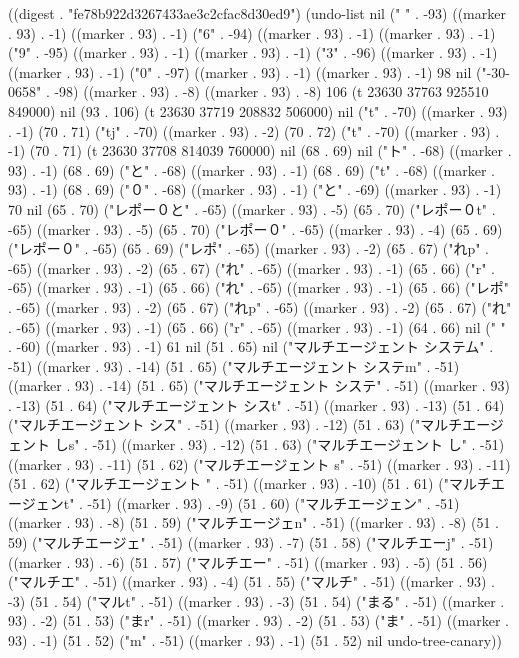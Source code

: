 
((digest . "fe78b922d3267433ae3c2cfac8d30ed9") (undo-list nil (" " . -93) ((marker . 93) . -1) ((marker . 93) . -1) ("6" . -94) ((marker . 93) . -1) ((marker . 93) . -1) ("9" . -95) ((marker . 93) . -1) ((marker . 93) . -1) ("3" . -96) ((marker . 93) . -1) ((marker . 93) . -1) ("0" . -97) ((marker . 93) . -1) ((marker . 93) . -1) 98 nil ("-30-0658" . -98) ((marker . 93) . -8) ((marker . 93) . -8) 106 (t 23630 37763 925510 849000) nil (93 . 106) (t 23630 37719 208832 506000) nil ("t" . -70) ((marker . 93) . -1) (70 . 71) ("tj" . -70) ((marker . 93) . -2) (70 . 72) ("t" . -70) ((marker . 93) . -1) (70 . 71) (t 23630 37708 814039 760000) nil (68 . 69) nil ("ト" . -68) ((marker . 93) . -1) (68 . 69) ("と" . -68) ((marker . 93) . -1) (68 . 69) ("t" . -68) ((marker . 93) . -1) (68 . 69) ("０" . -68) ((marker . 93) . -1) ("と" . -69) ((marker . 93) . -1) 70 nil (65 . 70) ("レポー０と" . -65) ((marker . 93) . -5) (65 . 70) ("レポー０t" . -65) ((marker . 93) . -5) (65 . 70) ("レポー０" . -65) ((marker . 93) . -4) (65 . 69) ("レポー０" . -65) (65 . 69) ("レポ" . -65) ((marker . 93) . -2) (65 . 67) ("れp" . -65) ((marker . 93) . -2) (65 . 67) ("れ" . -65) ((marker . 93) . -1) (65 . 66) ("r" . -65) ((marker . 93) . -1) (65 . 66) ("れ" . -65) ((marker . 93) . -1) (65 . 66) ("レポ" . -65) ((marker . 93) . -2) (65 . 67) ("れp" . -65) ((marker . 93) . -2) (65 . 67) ("れ" . -65) ((marker . 93) . -1) (65 . 66) ("r" . -65) ((marker . 93) . -1) (64 . 66) nil (" " . -60) ((marker . 93) . -1) 61 nil (51 . 65) nil ("マルチエージェント システム" . -51) ((marker . 93) . -14) (51 . 65) ("マルチエージェント システm" . -51) ((marker . 93) . -14) (51 . 65) ("マルチエージェント システ" . -51) ((marker . 93) . -13) (51 . 64) ("マルチエージェント シスt" . -51) ((marker . 93) . -13) (51 . 64) ("マルチエージェント シス" . -51) ((marker . 93) . -12) (51 . 63) ("マルチエージェント しs" . -51) ((marker . 93) . -12) (51 . 63) ("マルチエージェント し" . -51) ((marker . 93) . -11) (51 . 62) ("マルチエージェント s" . -51) ((marker . 93) . -11) (51 . 62) ("マルチエージェント " . -51) ((marker . 93) . -10) (51 . 61) ("マルチエージェンt" . -51) ((marker . 93) . -9) (51 . 60) ("マルチエージェン" . -51) ((marker . 93) . -8) (51 . 59) ("マルチエージェn" . -51) ((marker . 93) . -8) (51 . 59) ("マルチエージェ" . -51) ((marker . 93) . -7) (51 . 58) ("マルチエーj" . -51) ((marker . 93) . -6) (51 . 57) ("マルチエー" . -51) ((marker . 93) . -5) (51 . 56) ("マルチエ" . -51) ((marker . 93) . -4) (51 . 55) ("マルチ" . -51) ((marker . 93) . -3) (51 . 54) ("マルt" . -51) ((marker . 93) . -3) (51 . 54) ("まる" . -51) ((marker . 93) . -2) (51 . 53) ("まr" . -51) ((marker . 93) . -2) (51 . 53) ("ま" . -51) ((marker . 93) . -1) (51 . 52) ("m" . -51) ((marker . 93) . -1) (51 . 52) nil undo-tree-canary))
